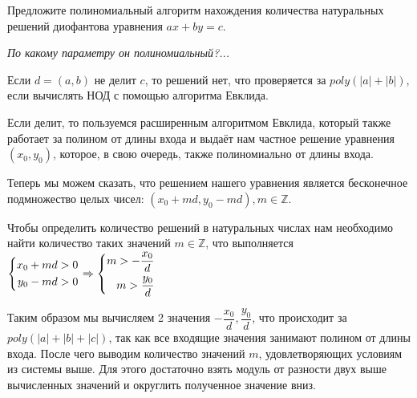 \documentclass[a4paper,12pt]{article}
\begin{document}
\begin{task}
	Предложите полиномиальный алгоритм нахождения количества натуральных решений диофантова уравнения $ax+by = c$. 
	
	\textit{По какому параметру он полиномиальный?...}
\end{task}

\begin{solution}
	Если $d = (a, b)$ не делит $c$, то решений нет, что проверяется за $poly(|a|+|b|)$, если вычислять НОД с помощью алгоритма Евклида.
	
	Если делит, то пользуемся расширенным алгоритмом Евклида, который также работает за полином от длины входа и выдаёт нам частное решение уравнения $(x_0, y_0)$, которое, в свою очередь, также полиномиально от длины входа.
	
	Теперь мы можем сказать, что решением нашего уравнения является бесконечное подмножество целых чисел: $(x_0 + md, y_0 - md), m \in \mathbb{Z}$.
	
	Чтобы определить количество решений в натуральных числах нам необходимо найти количество таких значений $m \in \mathbb{Z}$, что выполняется $\left\{
	\begin{aligned}
	x_0 + md > 0 \\
	y_0 - md > 0\\
	\end{aligned}
	\right.
	 \Rightarrow \left\{
	 \begin{aligned}
	 m > -\dfrac{x_0}{d} \\
	 m > \dfrac{y_0}{d}\\
	 \end{aligned}
	 \right.$

Таким образом мы вычисляем 2 значения $-\dfrac{x_0}{d}, \dfrac{y_0}{d}$, что происходит за $poly(|a|+|b| + |c|)$, так как все входящие значения занимают полином от длины входа. После чего выводим количество значений $m$, удовлетворяющих условиям из системы выше. Для этого достаточно взять модуль от разности двух выше вычисленных значений и округлить полученное значение вниз.
\end{solution}
\end{document}
